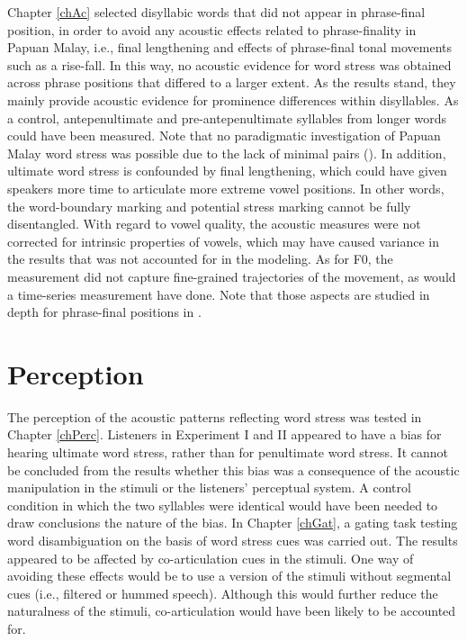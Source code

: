 Chapter \ref{chAc} selected disyllabic words that did not appear in phrase-final position, in order to avoid any acoustic effects related to phrase-finality in Papuan Malay, i.e., final lengthening and effects of phrase-final tonal movements such as a rise-fall. In this way, no acoustic evidence for word stress was obtained across phrase positions that differed to a larger extent. As the results stand, they mainly provide acoustic evidence for prominence differences within disyllables. As a control, antepenultimate and pre-antepenultimate syllables from longer words could have been measured. Note that no paradigmatic investigation of Papuan Malay word stress was possible due to the lack of minimal pairs (\citealt{vanheuven_acoustic_2018}). In addition, ultimate word stress is confounded by final lengthening, which could have given speakers more time to articulate more extreme vowel positions. In other words, the word-boundary marking and potential stress marking cannot be fully disentangled. With regard to vowel quality, the acoustic measures were not corrected for intrinsic properties of vowels, which may have caused variance in the results that was not accounted for in the modeling. As for F0, the measurement did not capture fine-grained trajectories of the movement, as would a time-series measurement have done. Note that those aspects are studied in depth for phrase-final positions in \citet{kaland_red_2023}.

\section{Perception}

The perception of the acoustic patterns reflecting word stress was tested in Chapter \ref{chPerc}. Listeners in Experiment I and II appeared to have a bias for hearing ultimate word stress, rather than for penultimate word stress. It cannot be concluded from the results whether this bias was a consequence of the acoustic manipulation in the stimuli or the listeners' perceptual system. A control condition in which the two syllables were identical would have been needed to draw conclusions the nature of the bias. In Chapter \ref{chGat}, a gating task testing word disambiguation on the basis of word stress cues was carried out. The results appeared to be affected by co-articulation cues in the stimuli. One way of avoiding these effects would be to use a version of the stimuli without segmental cues (i.e., filtered or hummed speech). Although this would further reduce the naturalness of the stimuli, co-articulation would have been likely to be accounted for.

